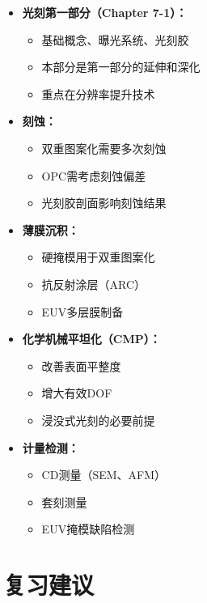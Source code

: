 \documentclass[UTF8,12pt,a4paper]{ctexart}
\begin{document}
\begin{itemize}
    \item \textbf{光刻第一部分（Chapter 7-1）：}
    \begin{itemize}
        \item 基础概念、曝光系统、光刻胶
        \item 本部分是第一部分的延伸和深化
        \item 重点在分辨率提升技术
    \end{itemize}
    
    \item \textbf{刻蚀：}
    \begin{itemize}
        \item 双重图案化需要多次刻蚀
        \item OPC需考虑刻蚀偏差
        \item 光刻胶剖面影响刻蚀结果
    \end{itemize}
    
    \item \textbf{薄膜沉积：}
    \begin{itemize}
        \item 硬掩模用于双重图案化
        \item 抗反射涂层（ARC）
        \item EUV多层膜制备
    \end{itemize}
    
    \item \textbf{化学机械平坦化（CMP）：}
    \begin{itemize}
        \item 改善表面平整度
        \item 增大有效DOF
        \item 浸没式光刻的必要前提
    \end{itemize}
    
    \item \textbf{计量检测：}
    \begin{itemize}
        \item CD测量（SEM、AFM）
        \item 套刻测量
        \item EUV掩模缺陷检测
    \end{itemize}
\end{itemize}

\section{复习建议}
\end{document}
